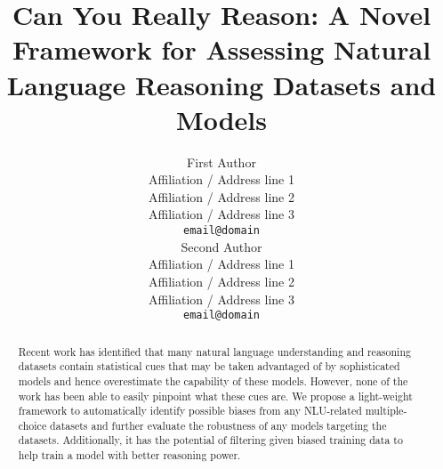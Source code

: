 \documentclass[11pt]{article}
\title{Can You Really Reason: A Novel Framework for Assessing Natural Language Reasoning Datasets and Models}
\author{First Author \\
  Affiliation / Address line 1 \\
  Affiliation / Address line 2 \\
  Affiliation / Address line 3 \\
  \texttt{email@domain} \\\And
  Second Author \\
  Affiliation / Address line 1 \\
  Affiliation / Address line 2 \\
  Affiliation / Address line 3 \\
  \texttt{email@domain} \\}
\begin{document}
\maketitle

\begin{abstract}
Recent work has identified that many natural language understanding and 
reasoning datasets contain statistical cues that
may be taken advantaged of by sophisticated models and hence overestimate the 
capability of these models. However, none of the work has been able to
easily pinpoint what these cues are.
We propose a light-weight framework to automatically identify possible biases
from any NLU-related multiple-choice datasets and further evaluate 
the robustness of any models targeting the datasets. 
Additionally, it has
the potential of filtering given biased training data to help train 
a model with better reasoning power. 
\end{abstract}






%





\end{document}
